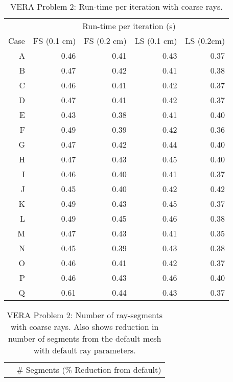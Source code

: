 {{{{        \begin{table}[htbp]
          \centering
          \caption{VERA Problem 2: Run-time per iteration with coarse rays.\label{tab:LSMOC:Lattice:CR:Run-time}}
          \small
          \begin{tabular}{rrrrr}\toprule
                  & \multicolumn{4}{c}{Run-time per iteration (s)}\\
             Case & FS (0.1 cm) & FS (0.2 cm) & LS (0.1 cm) & LS (0.2cm)\\\midrule
              A   & 0.46 & 0.41 & 0.43 & 0.37\\
              B   & 0.47 & 0.42 & 0.41 & 0.38\\
              C   & 0.46 & 0.41 & 0.42 & 0.37\\
              D   & 0.47 & 0.41 & 0.42 & 0.37\\
              E   & 0.43 & 0.38 & 0.41 & 0.40\\
              F   & 0.49 & 0.39 & 0.42 & 0.36\\
              G   & 0.47 & 0.42 & 0.44 & 0.40\\
              H   & 0.47 & 0.43 & 0.45 & 0.40\\
              I   & 0.46 & 0.40 & 0.41 & 0.37\\
              J   & 0.45 & 0.40 & 0.42 & 0.42\\
              K   & 0.49 & 0.43 & 0.45 & 0.37\\
              L   & 0.49 & 0.45 & 0.46 & 0.38\\
              M   & 0.47 & 0.43 & 0.41 & 0.35\\
              N   & 0.45 & 0.39 & 0.43 & 0.38\\
              O   & 0.46 & 0.41 & 0.42 & 0.37\\
              P   & 0.46 & 0.43 & 0.46 & 0.40\\
              Q   & 0.61 & 0.44 & 0.43 & 0.37\\\bottomrule
          \end{tabular}
        \end{table}
        \begin{table}[htbp]
          \centering
          \caption{
            VERA Problem 2: Number of ray-segments with coarse rays.
            Also shows reduction in number of segments from the default mesh with default ray parameters.\label{tab:LSMOC:Lattice:CR:Segments}}
          \small
          \begin{tabular}{rrrrr}\toprule
                  & \multicolumn{4}{c}{\# Segments (\% Reduction from default)}\\

\end{tabular}
\end{table}}}}}
